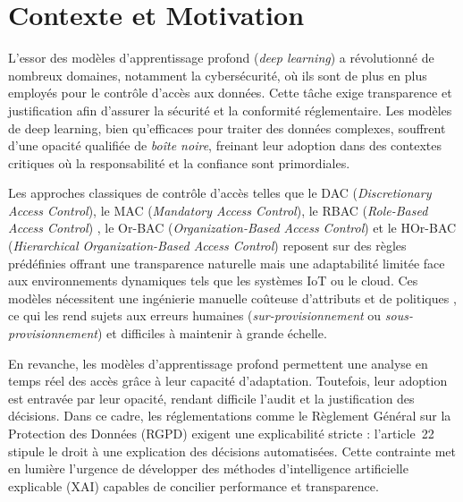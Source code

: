 \documentclass[12pt,a4paper]{article}
\begin{document}
\newpage
\tableofcontents
\newpage

\section{Contexte et Motivation}

L'essor des mod\`eles d'apprentissage profond (\textit{deep learning}) a r\'evolutionn\'e de nombreux domaines, notamment la cybers\'ecurit\'e, o\`u ils sont de plus en plus employ\'es pour le contr\^ole d'acc\`es aux donn\'ees. Cette t\^ache exige transparence et justification afin d'assurer la s\'ecurit\'e et la conformit\'e r\'eglementaire. Les mod\`eles de deep learning, bien qu'efficaces pour traiter des donn\'ees complexes, souffrent d'une opacit\'e qualifi\'ee de \textit{bo\^ite noire}, freinant leur adoption dans des contextes critiques o\`u la responsabilit\'e et la confiance sont primordiales.

Les approches classiques de contr\^ole d'acc\`es telles que le DAC (\textit{Discretionary Access Control}), le MAC (\textit{Mandatory Access Control}), le RBAC (\textit{Role-Based Access Control}) \cite{sandhu1996}, le Or-BAC (\textit{Organization-Based Access Control}) et le HOr-BAC (\textit{Hierarchical Organization-Based Access Control}) \cite{azanguezet2016} reposent sur des r\`egles pr\'ed\'efinies offrant une transparence naturelle mais une adaptabilit\'e limit\'ee face aux environnements dynamiques tels que les syst\`emes IoT ou le cloud. Ces mod\`eles n\'ecessitent une ing\'enierie manuelle co\^uteuse d'attributs et de politiques \cite{nobi2022}, ce qui les rend sujets aux erreurs humaines (\textit{sur-provisionnement} ou \textit{sous-provisionnement}) et difficiles \`a maintenir \`a grande \'echelle.

En revanche, les mod\`eles d'apprentissage profond permettent une analyse en temps r\'eel des acc\`es gr\^ace \`a leur capacit\'e d'adaptation. Toutefois, leur adoption est entrav\'ee par leur opacit\'e, rendant difficile l'audit et la justification des d\'ecisions. Dans ce cadre, les r\'eglementations comme le R\`eglement G\'en\'eral sur la Protection des Donn\'ees (RGPD) exigent une explicabilit\'e stricte : l'article~22 stipule le droit \`a une explication des d\'ecisions automatis\'ees. Cette contrainte met en lumi\`ere l'urgence de d\'evelopper des m\'ethodes d'intelligence artificielle explicable (XAI) capables de concilier performance et transparence\cite{goodman2017}.
\end{document}
